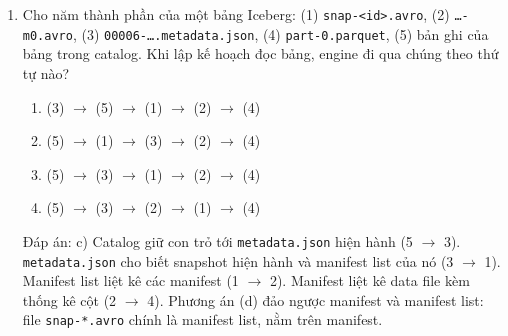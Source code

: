 \documentclass[12pt]{article}
\begin{document}
\begin{enumerate}[label=\textbf{\arabic*.}, leftmargin=1.6em, itemsep=1.2em]
\begin{enumerate}[label=\alph*), leftmargin=2.2em, itemsep=1pt]
    \item Data Lake: reader thấy 2 file đã ghi mà không có cảnh báo. Iceberg: reader vẫn thấy snapshot cũ vì con trỏ trong catalog chưa đổi.
    \item Data Lake: reader báo lỗi thiếu file. Iceberg: reader thấy 2 file đã ghi.
    \item Cả hai đều thấy 2 file đã ghi, vì object storage có strong consistency.
    \item Cả hai đều không thấy file nào, vì object storage chỉ hiển thị file khi job kết thúc.
\end{enumerate}
\begin{guidelinebox}{Đáp án: a)}
Ở Data Lake, ``bảng'' là mọi file dưới prefix, nên 2 file dở dang lập tức thuộc về bảng. Phần thực hành cho thấy reader thấy đúng 50\% số dòng mà không có cảnh báo. Ở Iceberg, data file mới chỉ được nhìn thấy khi metadata trỏ tới chúng và con trỏ trong catalog được đổi ở bước commit. Job chết trước commit nên snapshot hiện hành không đổi, 2 file kia trở thành orphan file. Strong consistency (c) chỉ bảo đảm đọc thấy object vừa ghi, không bảo đảm tính nguyên tử của nhiều file.
\end{guidelinebox}

\item Cho năm thành phần của một bảng Iceberg: (1) \texttt{snap-<id>.avro}, (2) \texttt{\dots-m0.avro}, (3) \texttt{00006-\dots.metadata.json}, (4) \texttt{part-0.parquet}, (5) bản ghi của bảng trong catalog. Khi lập kế hoạch đọc bảng, engine đi qua chúng theo thứ tự nào?

\begin{enumerate}[label=\alph*), leftmargin=2.2em, itemsep=1pt]
    \item (3) $\rightarrow$ (5) $\rightarrow$ (1) $\rightarrow$ (2) $\rightarrow$ (4)
    \item (5) $\rightarrow$ (1) $\rightarrow$ (3) $\rightarrow$ (2) $\rightarrow$ (4)
    \item (5) $\rightarrow$ (3) $\rightarrow$ (1) $\rightarrow$ (2) $\rightarrow$ (4)
    \item (5) $\rightarrow$ (3) $\rightarrow$ (2) $\rightarrow$ (1) $\rightarrow$ (4)
\end{enumerate}
\begin{guidelinebox}{Đáp án: c)}
Catalog giữ con trỏ tới \texttt{metadata.json} hiện hành (5 $\rightarrow$ 3). \texttt{metadata.json} cho biết snapshot hiện hành và manifest list của nó (3 $\rightarrow$ 1). Manifest list liệt kê các manifest (1 $\rightarrow$ 2). Manifest liệt kê data file kèm thống kê cột (2 $\rightarrow$ 4). Phương án (d) đảo ngược manifest và manifest list: file \texttt{snap-*.avro} chính là manifest list, nằm trên manifest.
\end{guidelinebox}


\end{enumerate}
\end{document}
